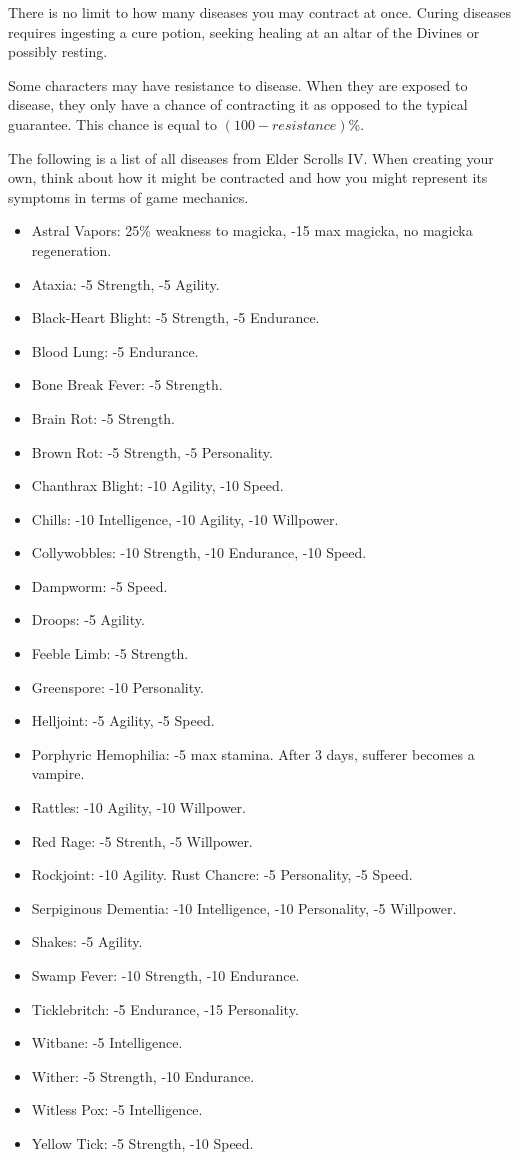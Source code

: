 \documentclass[12pt]{book}
\begin{document}
There is no limit to how many diseases you may contract at once. Curing diseases requires ingesting a cure potion, seeking healing at an altar of the Divines or possibly resting.

Some characters may have resistance to disease. When they are exposed to disease, they only have a chance of contracting it as opposed to the typical guarantee. This chance is equal to $(100-resistance)$\%.

The following is a list of all diseases from Elder Scrolls IV. When creating your own, think about how it might be contracted and how you might represent its symptoms in terms of game mechanics.

\begin{itemize}
	\item Astral Vapors: 25\% weakness to magicka, -15 max magicka, no magicka regeneration.
	\item Ataxia: -5 Strength, -5 Agility.
	\item Black-Heart Blight: -5 Strength, -5 Endurance.
	\item Blood Lung: -5 Endurance.
	\item Bone Break Fever: -5 Strength.
	\item Brain Rot: -5 Strength.
	\item Brown Rot: -5 Strength, -5 Personality.
	\item Chanthrax Blight: -10 Agility, -10 Speed.
	\item Chills: -10 Intelligence, -10 Agility, -10 Willpower.
	\item Collywobbles: -10 Strength, -10 Endurance, -10 Speed.
	\item Dampworm: -5 Speed.
	\item Droops: -5 Agility.
	\item Feeble Limb: -5 Strength.
	\item Greenspore: -10 Personality.
	\item Helljoint: -5 Agility, -5 Speed.
	\item Porphyric Hemophilia: -5 max stamina. After 3 days, sufferer becomes a vampire.
	\item Rattles: -10 Agility, -10 Willpower.
	\item Red Rage: -5 Strenth, -5 Willpower.
	\item Rockjoint: -10 Agility.
	Rust Chancre: -5 Personality, -5 Speed.
	\item Serpiginous Dementia: -10 Intelligence, -10 Personality, -5 Willpower.
	\item Shakes: -5 Agility.
	\item Swamp Fever: -10 Strength, -10 Endurance.
	\item Ticklebritch: -5 Endurance, -15 Personality.
	\item Witbane: -5 Intelligence.
	\item Wither: -5 Strength, -10 Endurance.
	\item Witless Pox: -5 Intelligence.
	\item Yellow Tick: -5 Strength, -10 Speed.
\end{itemize}
\end{document}
